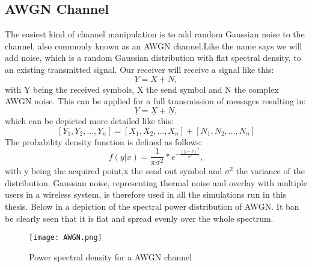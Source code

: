 \subsection{AWGN Channel}
\label{AWGN}

The easiest kind of channel manipulation is to add random Gaussian noise to the channel, also commonly known as an \gls{AWGN} channel.Like the name says we will add noise, which is a random Gaussian distribution with flat spectral density, to an existing transmitted signal. Our receiver will receive a signal like this:
\begin{equation}
\label{eq:1.1}
Y = X + N ,
\end{equation}
with Y being the received symbols, X the send symbol and N the complex AWGN noise. This can be applied for a full transmission of messages resulting in:
\begin{equation}
\label{eq:1.2}
\underline{Y} = \underline{X} + \underline{N},
\end{equation}
which can be depicted more detailed like this:
\begin{equation}
\label{eq:1.3}
[Y_1,Y_2,...,Y_n] = [X_1,X_2,...,X_n] + [N_1,N_2,...,N_n]
\end{equation}
 The probability density function is defined as follows:
\begin{equation}
\label{eq:AWGNpdf}
f(y|x) = \frac{1}{\pi\sigma^2}*e^{-\frac{(y-x)^2}{\sigma^2}},  
\end{equation}
with y being the acquired point,x the send out symbol and $\sigma^2$ the variance of the distribution.
Gaussian noise, representing thermal noise and overlay with multiple users in a wireless system, is therefore used in all the simulations run in this thesis. Below in  a depiction of the spectral power distribution of \gls{AWGN}. It ban be clearly seen that it is flat and spread evenly over the whole spectrum.
\begin{figure}[!htb]
	\centering
	\texttt{[image: AWGN.png]}
	\caption{Power spectral density for a AWGN channel}
	\label{fig:AWGN}
\end{figure}
\newpage
